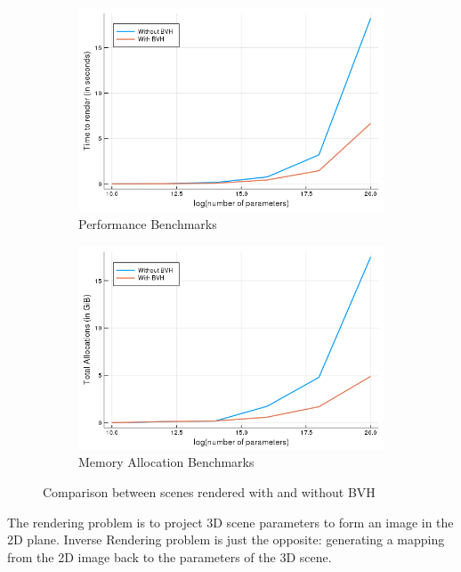 \documentclass{juliacon}
\begin{document}
\begin{figure}[!htb]
    \centering
    \begin{subfigure}[c]{0.45\textwidth}
        \includegraphics[width=\textwidth]{images/performance-speed.png}
        \caption{Performance Benchmarks}
        \label{fig:bvh_perf}
    \end{subfigure}
    \hfill
    \begin{subfigure}[c]{0.45\textwidth}
        \includegraphics[width=\textwidth]{images/performance-memory.png}
        \caption{Memory Allocation Benchmarks}
        \label{fig:bvh_mem}
    \end{subfigure}
    \caption{Comparison between scenes rendered with and without BVH}
    \label{fig:bvh}
\end{figure}

The rendering problem is to project 3D scene parameters to form an image in the 2D plane. Inverse Rendering problem is just the opposite: generating a mapping from the 2D image back to the parameters of the 3D scene.
\end{document}
